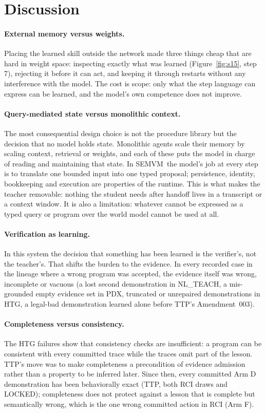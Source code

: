 \documentclass[10pt]{article}
\newcommand{\semvm}{SEMVM}
\begin{document}
\section{Discussion}\label{sec:discussion}

\paragraph{External memory versus weights.} Placing the learned skill outside the network made three things cheap that are hard in weight space: inspecting exactly what was learned (Figure~\ref{fig:s15}, step 7), rejecting it before it can act, and keeping it through restarts without any interference with the model. The cost is scope: only what the step language can express can be learned, and the model's own competence does not improve.

\paragraph{Query-mediated state versus monolithic context.} The most consequential design choice is not the procedure library but the decision that no model holds state. Monolithic agents scale their memory by scaling context, retrieval or weights, and each of these puts the model in charge of reading and maintaining that state. In \semvm\ the model's job at every step is to translate one bounded input into one typed proposal; persistence, identity, bookkeeping and execution are properties of the runtime. This is what makes the teacher removable: nothing the student needs after handoff lives in a transcript or a context window. It is also a limitation: whatever cannot be expressed as a typed query or program over the world model cannot be used at all.

\paragraph{Verification as learning.} In this system the decision that something has been learned is the verifier's, not the teacher's. That shifts the burden to the evidence. In every recorded case in the lineage where a wrong program was accepted, the evidence itself was wrong, incomplete or vacuous (a lost second demonstration in NL\_TEACH, a mis-grounded empty evidence set in PDX, truncated or unrepaired demonstrations in HTG, a legal-bad demonstration learned alone before TTP's Amendment~003).

\paragraph{Completeness versus consistency.} The HTG failures show that consistency checks are insufficient: a program can be consistent with every committed trace while the traces omit part of the lesson. TTP's move was to make completeness a precondition of evidence admission rather than a property to be inferred later. Since then, every committed Arm D demonstration has been behaviorally exact (TTP, both RCI draws and LOCKED); completeness does not protect against a lesson that is complete but semantically wrong, which is the one wrong committed action in RCI (Arm F).
\end{document}
